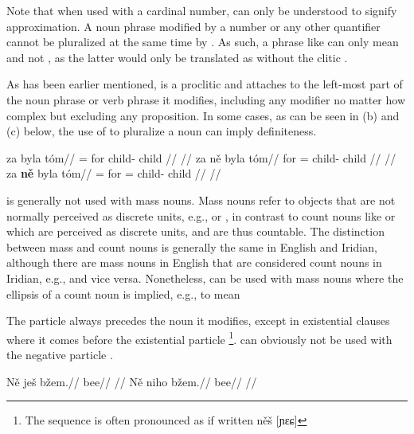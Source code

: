 Note that when used with a cardinal number,  can only be understood to
signify approximation. A noun phrase modified by a number or any other
quantifier cannot be pluralized at the same time by . As such, a phrase
like  can only mean  and not
, as the latter would only be translated as 
without the clitic .

As has been earlier mentioned,  is a proclitic and
attaches to the left-most part of the noun phrase or verb phrase it modifies,
including any modifier no matter how complex but excluding any proposition. In
some cases, as can be seen in (b) and (c) below, the use of  to
pluralize a noun can imply definiteness.

\pex
\a
\begingl{}
     za byla tóm//
    \glb \Pl{}= for child-\Acc{} child //
    \glft {}//
\endgl
\a
\begingl{}
    \gla za {ně} byla tóm//
    \glb for \Pl{}= child-\Acc{} child //
    \glft {}//
\endgl
\a
\begingl{}
     za \textbf{ně} byla tóm//
    \glb \Pl{}= for \Pl{}= child-\Acc{} child //
    \glft {}//
\endgl
\xe

 is generally not used with mass nouns. Mass nouns
refer to objects that are not normally perceived as discrete units, e.g.,
 or , in contrast to count nouns like
 or  which are perceived as discrete units, and
are thus countable. The distinction between mass and count nouns is generally
the same in English and Iridian, although there are mass nouns in English that
are considered count nouns in Iridian, e.g.,  and vice
versa. Nonetheless,  can be used with mass nouns where the ellipsis of a
count noun is implied, e.g.,  to mean 

The particle  always precedes the noun it modifies, except in
existential clauses where it comes before the existential particle
\footnote{The sequence is often pronounced as if written něš [ɲɛɕ]}.
 can obviously not be used with the negative particle
.

\pex
\a
\begingl
\gla Ně ješ bžem.//
\glb \Pl{} \Exst{} bee//
\glft {}//
\endgl
\a
\begingl
\gla *Ně niho bžem.//
\glb \Pl{} \N{}\Exst{} bee//
\glft {}//
\endgl
\xe

